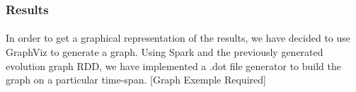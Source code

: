 \subsubsection{Results}
\label{sec:EvoGraphResults}

\paragraph{}
In order to get a graphical representation of the results, we have decided to use GraphViz to generate a graph. Using Spark and the previously generated evolution graph RDD, we have implemented a .dot file generator to build the graph on a particular time-span.
[Graph Exemple Required]
